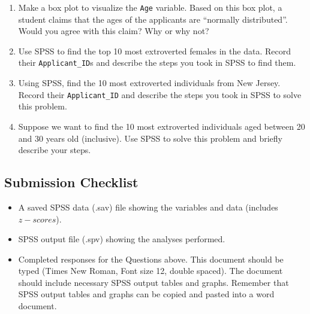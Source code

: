 \documentclass[
  letterpaper,
  DIV=11,
  numbers=noendperiod]{scrartcl}
\providecommand{\tightlist}{%
  \setlength{\itemsep}{0pt}\setlength{\parskip}{0pt}}\usepackage{longtable,booktabs,array}
\begin{document}
\begin{enumerate}
\def\labelenumi{\arabic{enumi}.}
\tightlist
\item
  Make a box plot to visualize the \texttt{Age} variable. Based on this
  box plot, a student claims that the ages of the applicants are
  ``normally distributed''. Would you agree with this claim? Why or why
  not?
\item
  Use SPSS to find the top 10 most extroverted females in the data.
  Record their \texttt{Applicant\_ID\textquotesingle{}}s and describe
  the steps you took in SPSS to find them.
\item
  Using SPSS, find the 10 most extroverted individuals from New Jersey.
  Record their \texttt{Applicant\_ID} and describe the steps you took in
  SPSS to solve this problem.
\item
  Suppose we want to find the 10 most extroverted individuals aged
  between 20 and 30 years old (inclusive). Use SPSS to solve this
  problem and briefly describe your steps.
\end{enumerate}

\subsection{Submission Checklist}\label{submission-checklist}

\begin{itemize}
\tightlist
\item[$\square$]
  A saved SPSS data (.sav) file showing the variables and data (includes
  \(z-scores\)).
\item[$\square$]
  SPSS output file (.spv) showing the analyses performed.
\item[$\square$]
  Completed responses for the Questions above. This document should be
  typed (Times New Roman, Font size 12, double spaced). The document
  should include necessary SPSS output tables and graphs. Remember that
  SPSS output tables and graphs can be copied and pasted into a word
  document.
\end{itemize}
\end{document}
